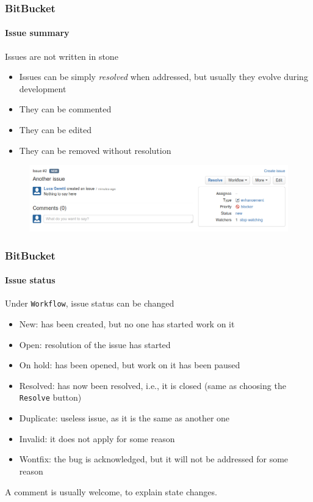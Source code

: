 \begin{frame}
\frametitle{BitBucket}
\framesubtitle{Issue summary}

\begin{block}{Issues are not written in stone}
\begin{itemize}
\item Issues can be simply {\em resolved} when addressed, but usually they evolve during development
\item They can be commented
\item They can be edited
\item They can be removed without resolution
\end{itemize}
\end{block}

\begin{figure}
\includegraphics[width=1.0\textwidth]{lecture04/img/issuecontrol.png}
\end{figure}

\end{frame}

\begin{frame}
\frametitle{BitBucket}
\framesubtitle{Issue status}

\begin{block}{Under \texttt{Workflow}, issue status can be changed}
\begin{itemize}
\item New: has been created, but no one has started work on it
\item Open: resolution of the issue has started
\item On hold: has been opened, but work on it has been paused
\item Resolved: has now been resolved, i.e., it is closed (same as choosing the \texttt{Resolve} button)
\item Duplicate: useless issue, as it is the same as another one
\item Invalid: it does not apply for some reason
\item Wontfix: the bug is acknowledged, but it will not be addressed for some reason
\end{itemize}
A comment is usually welcome, to explain state changes.
\end{block}

\end{frame}